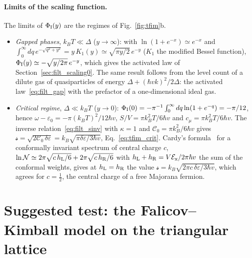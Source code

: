 \documentclass[10pt,a4paper]{article}
\theoremstyle{plain}
\newcommand{\cN}{\mathcal{N}}   %
\newcommand{\cE}{\mathcal{E}_{\rm x}}  %
\newcommand{\lds}{\mathscr{s}}  %
\begin{document}
\paragraph{Limits of the scaling function.} The limits of $\Phi_{\rm I}(y)$
are the regimes of Fig.~\ref{fig:tfim}b.
\begin{itemize}\setlength{\itemsep}{0pt}
\item \emph{Gapped phases}, $k_BT\ll\Delta$ ($y\to\infty$): with
  $\ln(1+e^{-x})\simeq e^{-x}$ and
  $\int_0^{\infty}dq\,e^{-\sqrt{q^{2}+y^{2}}}=y\,K_1(y)\simeq\sqrt{\pi y/2}\,e^{-y}$
  ($K_1$ the modified Bessel function),
  $\Phi_{\rm I}(y)\simeq-\sqrt{y/2\pi}\,e^{-y}$, which gives the activated
  law of Section~\ref{sec:filt_scaling0}. The same result follows from the
  level count of a dilute gas of quasiparticles of energy
  $\Delta+(\hbar vk)^{2}/2\Delta$: the activated law~\eqref{eq:filt_gap}
  with the prefactor of a one-dimensional ideal gas.
\item \emph{Critical regime}, $\Delta\ll k_BT$ ($y\to0$):
  $\Phi_{\rm I}(0)=-\pi^{-1}\int_0^{\infty}dq\ln(1+e^{-q})=-\pi/12$, hence
  $\omega-\varepsilon_0=-\pi(k_BT)^{2}/12\hbar v$,
  $S/V=\pi k_B^{2}T/6\hbar v$ and $c_\mu=\pi k_B^{2}T/6\hbar v$. The
  inverse relation~\eqref{eq:filt_sinv} with $\kappa=1$ and
  $\mathcal C_0=\pi k_B^{2}/6\hbar v$ gives
  $\lds=\sqrt{2\mathcal C_0\,\delta\varepsilon}=k_B\sqrt{\pi\delta\varepsilon/3\hbar v}$,
  Eq.~\eqref{eq:tfim_crit}. Cardy's formula~\cite{Cardy1986} for a
  conformally invariant spectrum of central charge $c$,
  $\ln\cN\simeq2\pi\sqrt{c\,h_{\rm L}/6}+2\pi\sqrt{c\,h_{\rm R}/6}$ with
  $h_{\rm L}+h_{\rm R}=V\cE/2\pi\hbar v$ the sum of the conformal weights,
  gives at $h_{\rm L}=h_{\rm R}$ the value
  $\lds=k_B\sqrt{2\pi c\,\delta\varepsilon/3\hbar v}$, which agrees for
  $c=\tfrac12$, the central charge of a free Majorana fermion.
\end{itemize}

\section{Suggested test: the Falicov--Kimball model on the triangular lattice}
\label{app:fkm}
\end{document}
